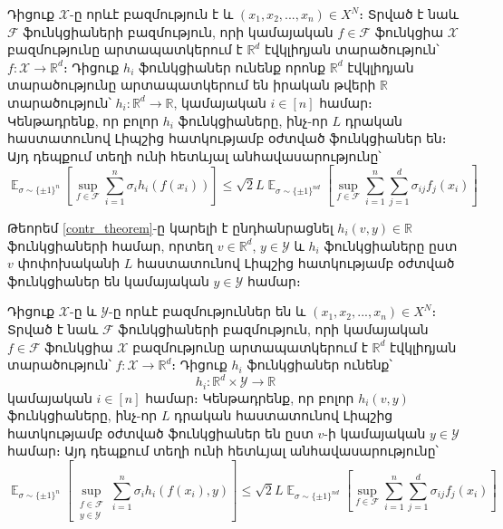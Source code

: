 \documentclass[11pt]{article}
\DeclareMathOperator*{\E}{\mathbb{E}}
\begin{document}
\begin{theorem}
\label{contr_theorem}
Դիցուք $\mathcal{X}$-ը որևէ բազմություն է և $(x_1, x_2, ..., x_n) \in X^N$։ Տրված է նաև $\mathcal{F}$ ֆունկցիաների բազմություն, որի կամայական $f \in \mathcal{F}$ ֆունկցիա $\mathcal{X}$ բազմությունը արտապատկերում է $\mathbb{R}^d$ էվկլիդյան տարածություն՝ $f:\mathcal{X} \rightarrow \mathbb{R}^d$։ Դիցուք $h_i$ ֆունկցիաներ ունենք որոնք $\mathbb{R}^d$ էվկլիդյան տարածությունը արտապատկերում են  իրական թվերի $\mathbb{R}$ տարածություն՝
$h_i:\mathbb{R}^d \rightarrow \mathbb{R}$, կամայական $i \in [n]$ համար։ Կենթադրենք, որ բոլոր $h_i$ ֆունկցիաները, ինչ-որ $L$ դրական հաստատունով Լիպշից հատկությամբ օժտված ֆունկցիաներ են։ Այդ դեպքում տեղի ունի հետևյալ անհավասարությունը՝
\begin{equation}
\label{contradiction_ineq}
\E_{\sigma \sim \{\pm 1\}^n}\left[\sup_{f \in \mathcal{F}}  \sum_{i=1}^n{\sigma_ih_i(f(x_i))}  \right]    \leq \sqrt{2}L \E_{\sigma \sim \{\pm1\}^{nd}} \left[  \sup_{f \in \mathcal{F}}  \sum_{i=1}^n\sum_{j=1}^d{\sigma_{ij}f_j(x_i)}   \right]
\end{equation}
\end{theorem}


\noindent
Թեորեմ \ref{contr_theorem}-ը կարելի է ընդհանրացնել  $h_i(v, y) \in \mathbb{R}$ ֆունկցիաների համար, որտեղ $v \in \mathbb{R}^d$, $y \in \mathcal{Y}$ և $h_i$ ֆունկցիաները ըստ $v$ փոփոխականի $L$ հաստատունով Լիպշից հատկությամբ օժտված ֆունկցիաներ են կամայական $y \in \mathcal{Y}$ համար։ 

\begin{theorem}
\label{contr_theorem}
Դիցուք $\mathcal{X}$-ը և $\mathcal{Y}$-ը որևէ բազմություններ են  և $(x_1, x_2, ..., x_n) \in X^N$։ Տրված է նաև $\mathcal{F}$ ֆունկցիաների բազմություն, որի կամայական $f \in \mathcal{F}$ ֆունկցիա $\mathcal{X}$ բազմությունը արտապատկերում է $\mathbb{R}^d$ էվկլիդյան տարածություն՝ $f:\mathcal{X} \rightarrow \mathbb{R}^d$։ Դիցուք $h_i$ ֆունկցիաներ ունենք՝ $$h_i:\mathbb{R}^d \times \mathcal{Y} \rightarrow \mathbb{R}$$ կամայական $i \in [n]$ համար։ Կենթադրենք, որ բոլոր $h_i(v, y)$ ֆունկցիաները, ինչ-որ $L$ դրական հաստատունով Լիպշից հատկությամբ օժտված ֆունկցիաներ են ըստ $v$-ի կամայական $y \in \mathcal{Y}$ համար։ Այդ դեպքում տեղի ունի հետևյալ անհավասարությունը՝
\begin{equation}
\label{contradiction_ineq}
\E_{\sigma \sim \{\pm 1\}^n}\left[\sup_{\substack{f \in \mathcal{F} \\ y \in \mathcal{Y}} }  \sum_{i=1}^n{\sigma_ih_i(f(x_i), y)}  \right]    \leq \sqrt{2}L \E_{\sigma \sim \{\pm1\}^{nd}} \left[  \sup_{f \in \mathcal{F}}  \sum_{i=1}^n\sum_{j=1}^d{\sigma_{ij}f_j(x_i)}   \right]
\end{equation}
\end{theorem}
\end{document}
